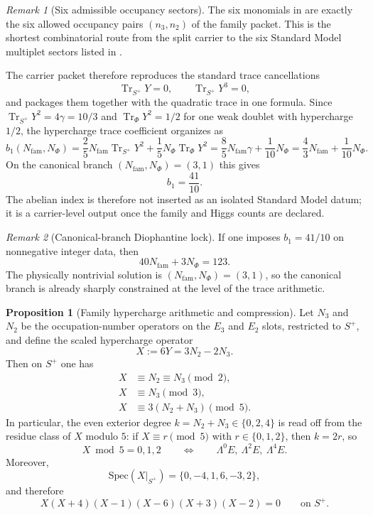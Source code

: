 \documentclass[11pt,a4paper]{article}
\theoremstyle{definition}
\newtheorem{proposition}[theorem]{Proposition}
\theoremstyle{remark}
\newtheorem*{remark}{Remark}
\DeclareMathOperator{\tr}{Tr}
\newcommand{\bone}{b_1}
\begin{document}
\begin{remark}[Six admissible occupancy sectors]
The six monomials in  are exactly the six allowed occupancy pairs $(n_3,n_2)$ of the family packet. This is the shortest combinatorial route from the split carrier to the six Standard Model multiplet sectors listed in .
\end{remark}

The carrier packet therefore reproduces the standard trace cancellations
\[
\tr_{S^+}Y=0,
\qquad
\tr_{S^+}Y^3=0,
\]
and packages them together with the quadratic trace in one formula. Since $\tr_{S^+}Y^2=4\gamma=10/3$ and $\tr_\Phi Y^2=1/2$ for one weak doublet with hypercharge $1/2$, the hypercharge trace coefficient organizes as
\begin{equation}
\label{eq:abelian-index}
\bone(N_{\mathrm{fam}},N_\Phi)
=
\frac25N_{\mathrm{fam}}\tr_{S^+}Y^2+\frac15N_\Phi\tr_\Phi Y^2
=
\frac85N_{\mathrm{fam}}\gamma+\frac1{10}N_\Phi
=
\frac43N_{\mathrm{fam}}+\frac1{10}N_\Phi.
\end{equation}
On the canonical branch $(N_{\mathrm{fam}},N_\Phi)=(3,1)$ this gives
\[
\bone=\frac{41}{10}.
\]
The abelian index is therefore not inserted as an isolated Standard Model datum; it is a carrier-level output once the family and Higgs counts are declared.

\begin{remark}[Canonical-branch Diophantine lock]
If one imposes $\bone=41/10$ on nonnegative integer data, then
\[
40N_{\mathrm{fam}}+3N_\Phi=123.
\]
The physically nontrivial solution is $(N_{\mathrm{fam}},N_\Phi)=(3,1)$, so the canonical branch is already sharply constrained at the level of the trace arithmetic.
\end{remark}

\begin{proposition}[Family hypercharge arithmetic and compression]
\label{prop:family-hypercharge-compression}
Let $N_3$ and $N_2$ be the occupation-number operators on the $E_3$ and $E_2$ slots, restricted to $S^+$, and define the scaled hypercharge operator
\[
X:=6Y=3N_2-2N_3.
\]
Then on $S^+$ one has
\begin{align}
X&\equiv N_2\equiv N_3 \pmod 2,\label{eq:x-mod-2}\\
X&\equiv N_3 \pmod 3,\label{eq:x-mod-3}\\
X&\equiv 3(N_2+N_3) \pmod 5.\label{eq:x-mod-5}
\end{align}
In particular, the even exterior degree $k=N_2+N_3\in\{0,2,4\}$ is read off from the residue class of $X$ modulo $5$: if $X\equiv r\pmod 5$ with $r\in\{0,1,2\}$, then $k=2r$, so
\[
X\bmod 5=0,1,2
\qquad\Longleftrightarrow\qquad
\Lambda^0E,\ \Lambda^2E,\ \Lambda^4E.
\]
Moreover,
\[
\mathrm{Spec}(X|_{S^+})=\{0,-4,1,6,-3,2\},
\]
and therefore
\begin{equation}
\label{eq:family-x-polynomial}
X(X+4)(X-1)(X-6)(X+3)(X-2)=0
\qquad\text{on }S^+.
\end{equation}
\end{proposition}
\end{document}
